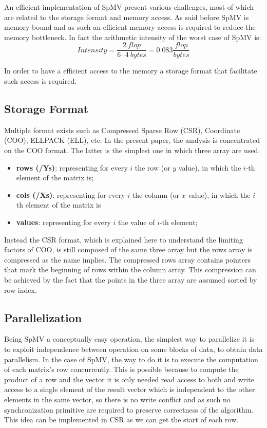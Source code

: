 \documentclass[conference]{IEEEtran}
\newcommand{\torem}[1]{\color{olive} #1 \color{black}}
\begin{document}
An efficient implementation of SpMV present various challenges, most of which are related to the storage format and memory access. As said before SpMV is memory-bound and as such an efficient memory access is required to reduce the memory bottleneck. In fact the arithmetic intensity of the worst case of SpMV is:
\[Intensity = \frac{2\ flop}{6 \cdot 4\ bytes} = 0.083\frac {flop}{bytes}\]

In order to have a efficient access to the memory a storage format that facilitate such access is required.

\subsection{Storage Format}

Multiple format exists such as Compressed Sparse Row (CSR), Coordinate (COO), ELLPACK (ELL), etc. In the present paper, the analysis is concentrated on the COO format. The latter is the simplest one in which three array are used:

\begin{itemize}
	\item \textbf{rows (/Ys)}: representing for every $i$ the row (or $y$ value), in which the $i$-th element of the matrix is;
	\item \textbf{cols (/Xs)}: representing for every $i$ the column (or $x$ value), in which the $i$-th element of the matrix is
	\item \textbf{values}: representing for every $i$ the value of $i$-th element;
\end{itemize}

Instead the CSR format, which is explained here to understand the limiting factors of COO, is still composed of the same three array but the rows array is compressed as the name implies. The compressed rows array contains pointers that mark the beginning of rows within the column array. This compression can be achieved by the fact that the points in the three array are assumed sorted by row index.

\subsection{Parallelization}
Being SpMV a conceptually easy operation, the simplest way to parallelize it is to exploit independence between operation on some blocks of data, to obtain data parallelism. In the case of SpMV, the way to do it is to execute the computation of each matrix's row concurrently. This is possible because to compute the product of a row and the vector it is only needed read access to both and write access to a single element of the result vector which is independent to the other elements in the same vector, so there is no write conflict and as such no synchronization primitive are required to preserve correctness of the algorithm. This idea can be implemented in CSR as we can get the start of each row.
\end{document}
